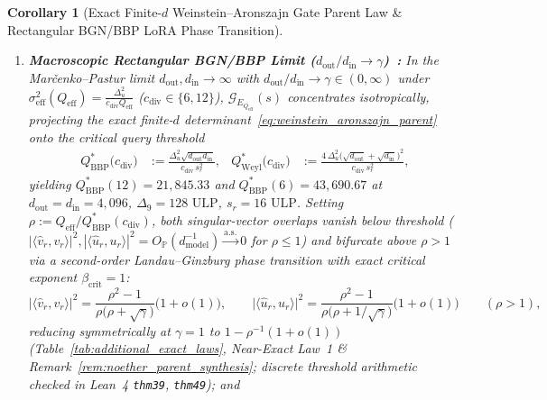\documentclass[11pt,letterpaper]{article}
\theoremstyle{spectralthm}
\newtheorem{corollary}[theorem]{Corollary}
\begin{document}
\begin{corollary}[Exact Finite-$d$ Weinstein--Aronszajn Gate Parent Law \& Rectangular BGN/BBP LoRA Phase Transition]
\begin{enumerate}
\begin{equation}
  \end{equation}
  \item[(ii)] \textbf{Macroscopic Rectangular BGN/BBP Limit ($d_{\mathrm{out}}/d_{\mathrm{in}} \to \gamma$)~\cite{benaych2012singular, marchenko1967distribution, baik2005phase, gavish2014optimal}:} In the Mar\v{c}enko--Pastur limit $d_{\mathrm{out}}, d_{\mathrm{in}} \to \infty$ with $d_{\mathrm{out}}/d_{\mathrm{in}} \to \gamma \in (0,\infty)$ under $\sigma_{\mathrm{eff}}^2(Q_{\mathrm{eff}}) = \frac{\Delta_u^2}{c_{\mathrm{div}} Q_{\mathrm{eff}}}$ ($c_{\mathrm{div}} \in \{6,12\}$), $\mathcal{G}_{E_{Q_{\mathrm{eff}}}}(s)$ concentrates isotropically, projecting the exact finite-$d$ determinant~\eqref{eq:weinstein_aronszajn_parent} onto the critical query threshold
  \begin{equation}
  \label{eq:bbp_thresholds}
  \begin{aligned}
  Q_{\mathrm{BBP}}^*\bigl(c_{\mathrm{div}}\bigr) &:= \frac{\Delta_u^2 \sqrt{d_{\mathrm{out}} d_{\mathrm{in}}}}{c_{\mathrm{div}}\,s_r^2}, &
  Q_{\mathrm{Weyl}}^*\bigl(c_{\mathrm{div}}\bigr) &:= \frac{4\,\Delta_u^2 \bigl(\sqrt{d_{\mathrm{out}}} + \sqrt{d_{\mathrm{in}}}\bigr)^2}{c_{\mathrm{div}}\,s_r^2},
  \end{aligned}
  \end{equation}
  yielding $Q_{\mathrm{BBP}}^*(12) = 21,845.33$ and $Q_{\mathrm{BBP}}^*(6) = 43,690.67$ at $d_{\mathrm{out}} = d_{\mathrm{in}} = 4,096$, $\Delta_9 = 128\text{~ULP}$, $s_r = 16\text{~ULP}$. Setting $\rho := Q_{\mathrm{eff}} / Q_{\mathrm{BBP}}^*(c_{\mathrm{div}})$, both singular-vector overlaps vanish below threshold ($|\langle \hat{v}_r, v_r \rangle|^2, |\langle \hat{u}_r, u_r \rangle|^2 = O_{\mathbb{P}}(d_{\mathrm{model}}^{-1}) \xrightarrow{\mathrm{a.s.}} 0$ for $\rho \le 1$) and bifurcate above $\rho > 1$ via a second-order Landau--Ginzburg phase transition with exact critical exponent $\beta_{\mathrm{crit}} = 1$:
  \begin{equation}
  \label{eq:bgn_left_right_overlap}
  \bigl|\langle \hat{v}_r, v_r \rangle\bigr|^2 = \frac{\rho^2 - 1}{\rho\bigl(\rho + \sqrt{\gamma}\bigr)}\bigl(1 + o(1)\bigr), \qquad
  \bigl|\langle \hat{u}_r, u_r \rangle\bigr|^2 = \frac{\rho^2 - 1}{\rho\bigl(\rho + 1/\sqrt{\gamma}\bigr)}\bigl(1 + o(1)\bigr) \qquad (\rho > 1),
  \end{equation}
  reducing symmetrically at $\gamma = 1$ to $1 - \rho^{-1}(1+o(1))$ (Table~\ref{tab:additional_exact_laws}, Near-Exact Law~1 \& Remark~\ref{rem:noether_parent_synthesis}; discrete threshold arithmetic checked in Lean~4 \texttt{thm39}, \texttt{thm49}); and

\end{enumerate}
\end{corollary}
\end{document}
